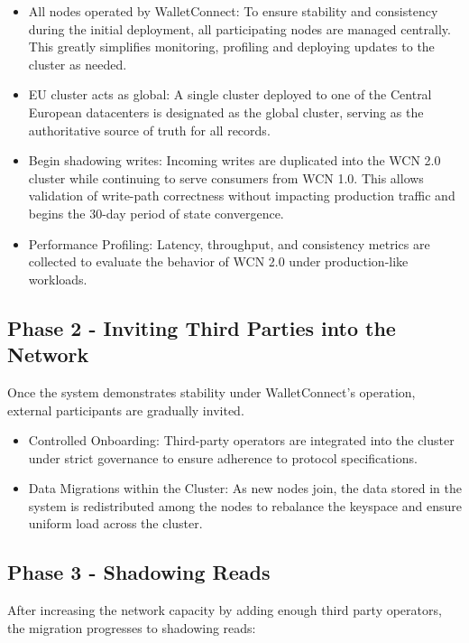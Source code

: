 \documentclass[10pt,twocolumn]{article}
\begin{document}
\begin{itemize}
    \item All nodes operated by WalletConnect: To ensure stability and consistency during the initial deployment, all participating nodes are managed centrally. This greatly simplifies monitoring, profiling and deploying updates to the cluster as needed.
    \item EU cluster acts as global: A single cluster deployed to one of the Central European datacenters is designated as the global cluster, serving as the authoritative source of truth for all records.
    \item Begin shadowing writes: Incoming writes are duplicated into the WCN 2.0 cluster while continuing to serve consumers from WCN 1.0. This allows validation of write-path correctness without impacting production traffic and begins the 30-day period of state convergence.
    \item Performance Profiling: Latency, throughput, and consistency metrics are collected to evaluate the behavior of WCN 2.0 under production-like workloads.
\end{itemize}

\subsection*{Phase 2 - Inviting Third Parties into the Network}

Once the system demonstrates stability under WalletConnect's operation, external participants are gradually invited.

\begin{itemize}
    \item Controlled Onboarding: Third-party operators are integrated into the cluster under strict governance to ensure adherence to protocol specifications.
    \item Data Migrations within the Cluster: As new nodes join, the data stored in the system is redistributed among the nodes to rebalance the keyspace and ensure uniform load across the cluster.
\end{itemize}

\subsection*{Phase 3 - Shadowing Reads}

After increasing the network capacity by adding enough third party operators, the migration progresses to shadowing reads:
\end{document}
